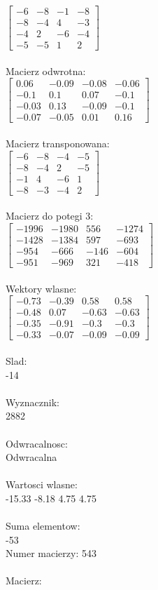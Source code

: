 \documentclass[a4paper,12pt]{article}
\begin{document}
$\begin{bmatrix} -6&-8&-1&-8\\-8&-4&4&-3\\-4&2&-6&-4\\-5&-5&1&2 \end{bmatrix}$
\\
\\
Macierz odwrotna:\\

$\begin{bmatrix} 0.06&-0.09&-0.08&-0.06\\-0.1&0.1&0.07&-0.1\\-0.03&0.13&-0.09&-0.1\\-0.07&-0.05&0.01&0.16 \end{bmatrix}$
\\
\\
Macierz transponowana:\\

$\begin{bmatrix} -6&-8&-4&-5\\-8&-4&2&-5\\-1&4&-6&1\\-8&-3&-4&2 \end{bmatrix}$
\\
\\
Macierz do potegi 3:\\

$\begin{bmatrix} -1996&-1980&556&-1274\\-1428&-1384&597&-693\\-954&-666&-146&-604\\-951&-969&321&-418 \end{bmatrix}$
\\
\\
Wektory wlasne:\\

$\begin{bmatrix} -0.73&-0.39&0.58&0.58\\-0.48&0.07&-0.63&-0.63\\-0.35&-0.91&-0.3&-0.3\\-0.33&-0.07&-0.09&-0.09 \end{bmatrix}$
\\
\\
Slad:\\
-14
\\
\\
Wyznacznik:\\
2882
\\
\\
Odwracalnosc:\\
Odwracalna
\\
\\
Wartosci wlasne:\\
-15.33 -8.18 4.75 4.75
\\
\\
Suma elementow:\\
-53
\\
\newpage
Numer macierzy:
543
\\
\\
Macierz:\\
\end{document}

